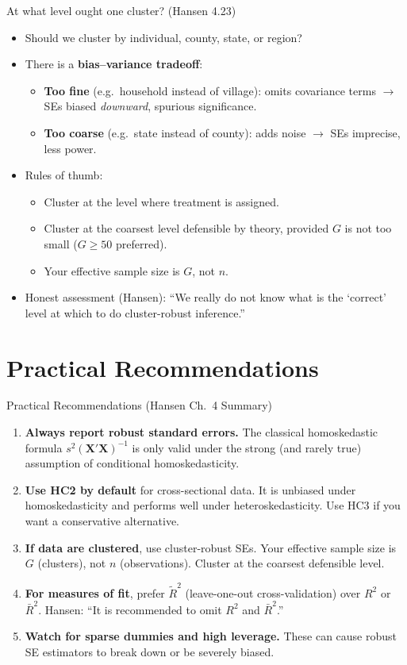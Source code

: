 \documentclass[aspectratio=169]{beamer}
\numberwithin{equation}{section}
\begin{document}
\begin{frame}{At what level ought one cluster? (Hansen 4.23)}
\begin{itemize}
\item Should we cluster by individual, county, state, or region?
\item There is a \textbf{bias--variance tradeoff}: \pause
\begin{itemize}
\item \textbf{Too fine} (e.g.\ household instead of village): omits covariance terms $\rightarrow$ SEs biased \emph{downward}, spurious significance. \pause
\item \textbf{Too coarse} (e.g.\ state instead of county): adds noise $\rightarrow$ SEs imprecise, less power. \pause
\end{itemize}
\item Rules of thumb:
\begin{itemize}
\item Cluster at the level where treatment is assigned.
\item Cluster at the coarsest level defensible by theory, provided $G$ is not too small ($G\geq 50$ preferred).
\item Your effective sample size is $G$, not $n$.
\end{itemize}\pause
\item \alert{Honest assessment} (Hansen): ``We really do not know what is the `correct' level at which to do cluster-robust inference.''
\end{itemize}
 \end{frame}
 
 \section{Practical Recommendations}

\begin{frame}{Practical Recommendations (Hansen Ch.\ 4 Summary)}
\begin{enumerate}
\item \textbf{Always report robust standard errors.}  The classical homoskedastic formula $s^2(\bm{X'X})^{-1}$ is only valid under the strong (and rarely true) assumption of conditional homoskedasticity. \pause
\item \textbf{Use HC2 by default} for cross-sectional data.  It is unbiased under homoskedasticity and performs well under heteroskedasticity.  Use HC3 if you want a conservative alternative. \pause
\item \textbf{If data are clustered}, use cluster-robust SEs.  Your effective sample size is $G$ (clusters), not $n$ (observations).  Cluster at the coarsest defensible level. \pause
\item \textbf{For measures of fit}, prefer $\tilde{R}^2$ (leave-one-out cross-validation) over $R^2$ or $\bar{R}^2$.  Hansen:  ``It is recommended to omit $R^2$ and $\bar{R}^2$.'' \pause
\item \textbf{Watch for sparse dummies and high leverage.}  These can cause robust SE estimators to break down or be severely biased.
\end{enumerate}
\end{frame}
\end{document}

